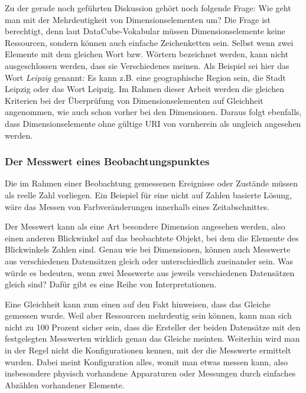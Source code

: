 \documentclass[11pt]{article}
\newcommand{\com}[1]{\marginpar{\em {\small{#1}}}} %
\begin{document}
\newpage
\noindent
Zu der gerade noch geführten Diskussion gehört noch folgende Frage: Wie geht man mit der Mehrdeutigkeit von Dimensionselementen um? Die Frage ist berechtigt, denn laut DataCube-Vokabular müssen Dimensionselemente keine Ressourcen, sondern können auch einfache Zeichenketten sein. Selbst wenn zwei Elemente mit dem gleichen Wort bzw. Wörtern bezeichnet werden, kann nicht ausgeschlossen werden, dass sie Verschiedenes meinen. Als Beispiel sei hier das Wort \emph{Leipzig} genannt: Es kann z.B. eine geographische Region sein, die Stadt Leipzig oder das Wort Leipzig. Im Rahmen dieser Arbeit werden die gleichen Kriterien bei der Überprüfung von Dimensionselementen auf Gleichheit angenommen, wie auch schon vorher bei den Dimensionen. Daraus folgt ebenfalls, dass Dimensionselemente ohne gültige URI von vornherein als ungleich angesehen werden.

%
% 
\subsubsection{Der Messwert eines Beobachtungspunktes}
\label{sec:chapterInterpretationOfMeasure}

%
%
Die im Rahmen einer Beobachtung gemessenen Ereignisse oder Zustände müssen\com{Anforderung \\ F-80, S. \pageref{req:F80}}\label{req:F80source} als reelle Zahl vorliegen. Ein Beispiel für eine nicht auf Zahlen basierte Lösung, wäre das Messen von Farbveränderungen innerhalb eines Zeitabschnittes. 

Der Messwert kann als eine Art besondere Dimension angesehen werden, also einen anderen Blickwinkel auf das beobachtete Objekt, bei dem die Elemente des Blickwinkels Zahlen sind. Genau wie bei Dimensionen, können auch Messwerte aus verschiedenen Datensätzen gleich oder unterschiedlich zueinander sein. Was würde es bedeuten, wenn zwei Messwerte aus jeweils verschiedenen Datensätzen gleich sind? Dafür gibt es eine Reihe von Interpretationen.

Eine Gleichheit kann zum einen auf den Fakt hinweisen, dass das Gleiche gemessen wurde. Weil aber Ressourcen mehrdeutig sein können, kann man sich nicht zu 100 Prozent sicher sein, dass die Ersteller der beiden Datensätze mit den festgelegten Messwerten wirklich genau das Gleiche meinten. Weiterhin wird man in der Regel nicht die Konfigurationen kennen, mit der die Messwerte ermittelt wurden. Dabei meint Konfiguration alles, womit man etwas messen kann, also insbesondere physisch vorhandene Apparaturen oder Messungen durch einfaches Abzählen vorhandener Elemente.
\end{document}
